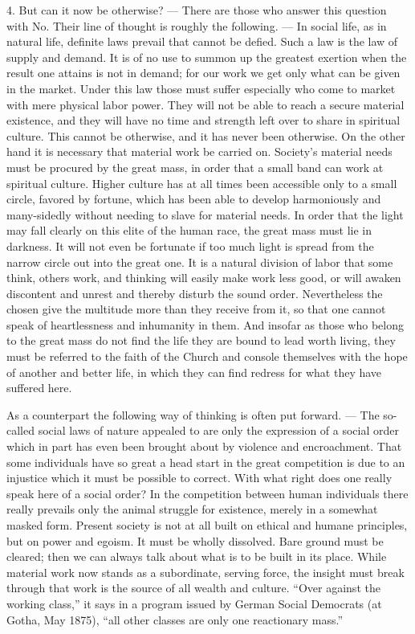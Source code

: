 \documentclass[12pt,a4paper,openany]{book}
\newcommand{\opage}[1]{\marginnote{\footnotesize\textit{[#1]}}}
\begin{document}
4. But can it now be otherwise? --- There are those who answer this question with No. Their line of thought is roughly
the following. --- In social life, as in natural life, definite laws prevail that cannot be defied. Such a law is the law
of supply and demand. It is of no use to summon up the greatest exertion when the result one attains is not in demand;
for our work we get only what can be given in the market. Under this law those must suffer especially who come to market
with mere physical labor power. They will not be able to reach a secure material existence, and they will have no time
and strength left over to share in spiritual culture. This cannot be otherwise, and it has never been otherwise. On the
other hand it is necessary that material work be carried on. Society's material needs must be procured by the great mass,
in order that a small band can work at spiritual culture. Higher culture has at all times been accessible only to a small
circle, favored by fortune, which has been able to develop harmoniously and many-sidedly without needing to slave for
material needs. In order that the light may fall clearly on this elite of the human race, the great mass must lie in
darkness. It will not even be fortunate if too much light is spread from the narrow circle out into the great one. It is a
natural division of labor that some think, others work, and thinking will easily make work less good, or will awaken
discontent and unrest and thereby disturb the sound order. Nevertheless the chosen give the multitude more than they
receive from it, so that one cannot speak of heartlessness and inhumanity in them. And insofar as those who belong to the
great mass do not find the life they are bound to lead worth living, they must be referred to
\opage{371}the faith of the Church and console themselves with the hope of another and better life, in which they can
find redress for what they have suffered here.

As a counterpart the following way of thinking is often put forward. --- The so-called social laws of nature appealed to
are only the expression of a social order which in part has even been brought about by violence and encroachment. That
some individuals have so great a head start in the great competition is due to an injustice which it must be possible to
correct. With what right does one really speak here of a social order? In the competition between human individuals there
really prevails only the animal struggle for existence, merely in a somewhat masked form. Present society is not at all
built on ethical and humane principles, but on power and egoism. It must be wholly dissolved. Bare ground must be cleared;
then we can always talk about what is to be built in its place. While material work now stands as a subordinate, serving
force, the insight must break through that work is the source of all wealth and culture. ``Over against the working
class,'' it says in a program issued by German Social Democrats (at Gotha, May 1875), ``all other classes are only one
reactionary mass.''
\end{document}
